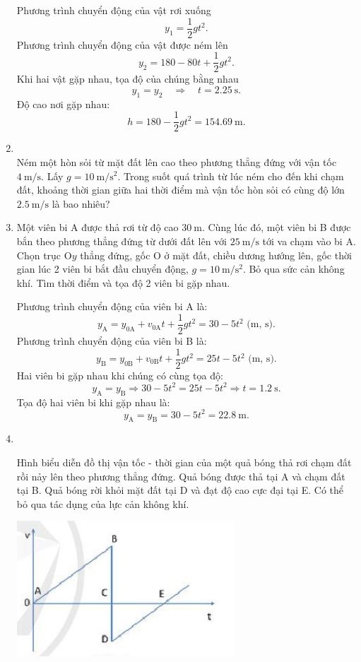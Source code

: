 \begin{enumerate}[label=\bfseries Bài \arabic*:,leftmargin=1.5cm]
{	Phương trình chuyển động của vật rơi xuống
	$$y_1 =\dfrac{1}{2}gt^2.$$
	Phương trình chuyển động của vật được ném lên
	$$y_2 =180 - 80t + \dfrac{1}{2}gt^2.$$
	Khi hai vật gặp nhau, tọa độ của chúng bằng nhau
	$$y_1=y_2 \quad
	\Rightarrow\quad t =\SI{2.25}{\second}.$$
	Độ cao nơi gặp nhau:
	$$h = 180 - \dfrac{1}{2}gt^2 = \SI{154,69}{\meter}.$$		
	
}

\item {}\\
{Ném một hòn sỏi từ mặt đất lên cao theo phương thẳng đứng với vận tốc $\SI{4}{\meter/\second}$. Lấy $g = \SI{10}{\meter/\second^2}$. Trong suốt quá trình từ lúc ném cho đến khi chạm đất, khoảng thời gian giữa hai thời điểm mà vận tốc hòn sỏi có cùng độ lớn $\SI{2.5}{\meter/\second}$ là bao nhiêu?
}
\item {}


{
	Một viên bi A được thả rơi từ độ cao $\SI{30}{\meter}$. Cùng lúc đó, một viên bi B được bắn theo phương thẳng đứng từ dưới đất lên với $\SI{25}{\meter/\second}$ tới va chạm vào bi A. Chọn trục O$y$ thẳng đứng, gốc O ở mặt đất, chiều dương hướng lên, gốc thời gian lúc 2 viên bi bắt đầu chuyển động, $g=\SI{10}{\meter/\second^2}$. Bỏ qua sức cản không khí. Tìm thời điểm và tọa độ 2 viên bi gặp nhau.
}
\hideall
{	
	
	Phương trình chuyển động của viên bi A là:
	$$y_{\text{A}}=y_{0\text{A}}+v_{0\text{A}}t+\dfrac{1}{2}gt^2=30-5t^2 \textrm{ (m, s)}.$$
	Phương trình chuyển động của viên bi B là:
	$$y_{\text{B}}=y_{0\text{B}}+v_{0\text{B}}t+\dfrac{1}{2}gt^2=25t-5t^2\textrm{ (m, s)}.$$
	Hai viên bi gặp nhau khi chúng có cùng tọa độ:
	$$y_{\text{A}}=y_{\text{B}}\Rightarrow 30-5t^2=25t-5t^2 \Rightarrow t=\SI{1.2}{\second}.$$
	Tọa độ hai viên bi khi gặp nhau là:
	$$y_{\text{A}}=y_{\text{B}}=30-5t^2=\SI{22.8}{\meter}.$$
}

\item {}\\
{Hình biểu diễn đồ thị vận tốc - thời gian của một quả bóng thả rơi chạm đất rồi nảy lên theo phương thẳng đứng. Quả bóng được thả tại A và chạm đất tại B. Quả bóng rời khỏi mặt đất tại D và đạt độ cao cực đại tại E. Có thể bỏ qua tác dụng của lực cản không khí.
	\begin{center}
		\includegraphics[scale=1]{../figs/VN10-2022-PH-TP012-6.jpg}
	\end{center}
	
}
\end{enumerate}
